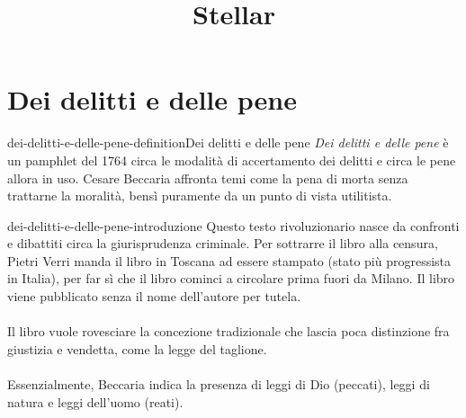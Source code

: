 \documentclass[preview]{standalone}
\begin{document}
\title{Stellar}
\genpage

\section{Dei delitti e delle pene}

\begin{snippetdefinition}{dei-delitti-e-delle-pene-definition}{Dei delitti e delle pene}
    \textit{Dei delitti e delle pene} è un pamphlet del 1764 circa
    le modalità di accertamento dei delitti e circa le pene allora in uso.
    Cesare Beccaria affronta temi come la pena di morta senza trattarne la moralità, bensì puramente
    da un punto di vista utilitista.
\end{snippetdefinition}

\begin{snippet}{dei-delitti-e-delle-pene-introduzione}
    Questo testo rivoluzionario nasce da confronti e dibattiti circa la giurisprudenza criminale.
    Per sottrarre il libro alla censura, Pietri Verri manda il libro in Toscana
    ad essere stampato (stato più progressista in Italia),
    per far sì che il libro cominci a circolare prima fuori da Milano.
    Il libro viene pubblicato senza il nome dell'autore per tutela.
    \\\\
    Il libro vuole rovesciare la concezione tradizionale che lascia poca distinzione fra giustizia e vendetta,
    come la legge del taglione.
    \\\\
    Essenzialmente, Beccaria indica la presenza di leggi di Dio (peccati), leggi di natura e leggi dell'uomo (reati).
\end{snippet}
\end{document}
